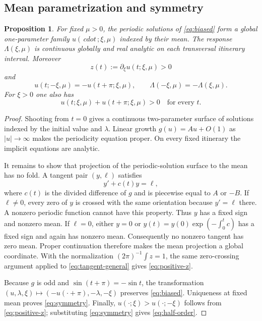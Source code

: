\documentclass[11pt]{article}
\newtheorem{proposition}[theorem]{Proposition}
\begin{document}
\subsection{Mean parametrization and symmetry}

\begin{proposition}\label{prop:mean}
For fixed $\mu>0$, the periodic solutions of \eqref{eq:biased} form a global one-parameter family $u(\,cdot\,;\xi,\mu)$ indexed by their mean.  The response $\Lambda(\xi,\mu)$ is continuous globally and real analytic on each transversal itinerary interval.  Moreover
\begin{equation}\label{eq:positive-z}
 z(t):=\partial_\xi u(t;\xi,\mu)>0
\end{equation}
and
\begin{equation}\label{eq:symmetry}
 u(t;-\xi,\mu)=-u(t+\pi;\xi,\mu),
 \qquad
 \Lambda(-\xi,\mu)=-\Lambda(\xi,\mu).
\end{equation}
For $\xi>0$ one also has
\begin{equation}\label{eq:half-order}
 u(t;\xi,\mu)+u(t+\pi;\xi,\mu)>0
 \quad\text{for every }t.
\end{equation}
\end{proposition}

\begin{proof}
Shooting from $t=0$ gives a continuous two-parameter surface of solutions indexed by the initial value and $\lambda$.  Linear growth $g(u)=Au+O(1)$ as $|u|\to\infty$ makes the periodicity equation proper.  On every fixed itinerary the implicit equations are analytic.

It remains to show that projection of the periodic-solution surface to the mean has no fold.  A tangent pair $(y,\ell)$ satisfies
\begin{equation}\label{eq:tangent-general}
 y'+c(t)y=\ell,
\end{equation}
where $c(t)$ is the divided difference of $g$ and is piecewise equal to $A$ or $-B$.  If $\ell\ne0$, every zero of $y$ is crossed with the same orientation because $y'=\ell$ there.  A nonzero periodic function cannot have this property.  Thus $y$ has a fixed sign and nonzero mean.  If $\ell=0$, either $y=0$ or $y(t)=y(0)\exp(-\int_0^t c)$ has a fixed sign and again has nonzero mean.  Consequently no nonzero tangent has zero mean.  Proper continuation therefore makes the mean projection a global coordinate.  With the normalization $(2\pi)^{-1}\int z=1$, the same zero-crossing argument applied to \eqref{eq:tangent-general} gives \eqref{eq:positive-z}.

Because $g$ is odd and $\sin(t+\pi)=-\sin t$, the transformation $(u,\lambda,\xi)\mapsto(-u(\cdot+\pi),-\lambda,-\xi)$ preserves \eqref{eq:biased}.  Uniqueness at fixed mean proves \eqref{eq:symmetry}.  Finally, $u(\cdot;\xi)>u(\cdot;-\xi)$ follows from \eqref{eq:positive-z}; substituting \eqref{eq:symmetry} gives \eqref{eq:half-order}.
\end{proof}
\end{document}
